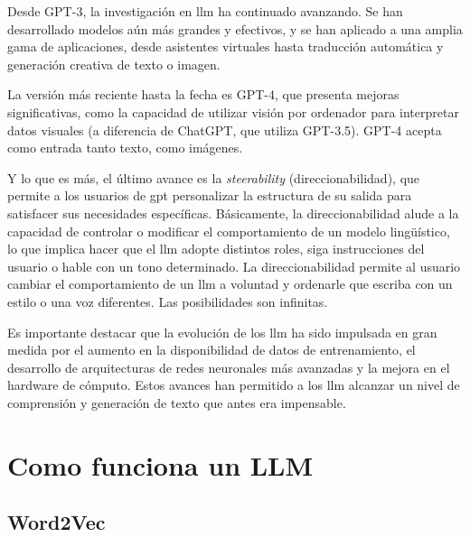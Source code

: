 \begin{description}
Desde GPT-3, la investigación en \acrshort{llm} ha continuado avanzando. Se han desarrollado modelos aún más grandes y efectivos, y se han aplicado a una amplia gama de aplicaciones, desde asistentes virtuales hasta traducción automática y generación creativa de texto o imagen.

La versión más reciente hasta la fecha es GPT-4, que presenta mejoras significativas, como la capacidad de utilizar visión por ordenador para interpretar datos visuales (a diferencia de ChatGPT, que utiliza GPT-3.5). GPT-4 acepta como entrada tanto texto, como imágenes. 

Y lo que es más, el último avance es la \textit{steerability} (direccionabilidad), que permite a los usuarios de \acrshort{gpt} personalizar la estructura de su salida para satisfacer sus necesidades específicas. Básicamente, la direccionabilidad alude a la capacidad de controlar o modificar el comportamiento de un modelo lingüístico, lo que implica hacer que el \acrshort{llm} adopte distintos roles, siga instrucciones del usuario o hable con un tono determinado. La direccionabilidad permite al usuario cambiar el comportamiento de un \acrshort{llm} a voluntad y ordenarle que escriba con un estilo o una voz diferentes. Las posibilidades son infinitas.

\end{description}


Es importante destacar que la evolución de los \acrshort{llm} ha sido impulsada en gran medida por el aumento en la disponibilidad de datos de entrenamiento, el desarrollo de arquitecturas de redes neuronales más avanzadas y la mejora en el hardware de cómputo. Estos avances han permitido a los \acrshort{llm} alcanzar un nivel de comprensión y generación de texto que antes era impensable.

\section{Como funciona un LLM}



\subsection{Word2Vec}

